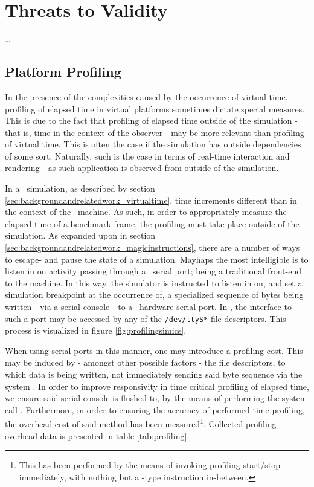 
\chapter{Threats to Validity}
\ldots

\section{Platform Profiling}
\label{sec:threatstovalidity_platformprofiling}
In the presence of the complexities caused by the occurrence of virtual time, profiling of elapsed time in virtual platforms sometimes dictate special measures.
This is due to the fact that profiling of elapsed time outside of the simulation - that is, time in the context of the observer - may be more relevant than profiling of virtual time.
This is often the case if the simulation has outside dependencies of some sort.
Naturally, such is the case in terms of real-time interaction and rendering - as such application is observed from outside of the simulation.

In a \dvttermsimics\ simulation, as described by section \ref{sec:backgroundandrelatedwork_virtualtime}, time increments different than in the context of the \dvttermhost\ machine.
As such, in order to appropriately measure the elapsed time of a benchmark frame, the profiling must take place outside of the simulation.
As expanded upon in section \ref{sec:backgroundandrelatedwork_magicinstructions}, there are a number of ways to escape- and pause the state of a simulation.
Mayhaps the most intelligible is to listen in on activity passing through a \dvttermtarget\ serial port; being a traditional front-end to the machine.
In this way, the simulator is instructed to listen in on, and set a simulation breakpoint at the occurrence of, a specialized sequence of bytes being written - via a serial console - to a \dvttermuart\ hardware serial port.
In \dvttermlinux , the interface to such a port may be accessed by any of the \texttt{/dev/ttyS*} file descriptors.
This process is visualized in figure \ref{fig:profilingsimics}.



When using serial ports in this manner, one may introduce a profiling cost.
This may be induced by - amongst other possible factors - the file descriptors, to which data is being written, not immediately sending said byte sequence via the system \dvttermuart .
In order to improve responsivity in time critical profiling of elapsed time, we ensure said serial console is flushed to, by the means of performing the system call .
Furthermore, in order to ensuring the accuracy of performed time profiling, the overhead cost of said method has been measured\footnote{This has been performed by the means of invoking profiling start/stop immediately, with nothing but a -type instruction in-between.}.
Collected profiling overhead data is presented in table \ref{tab:profiling}.

